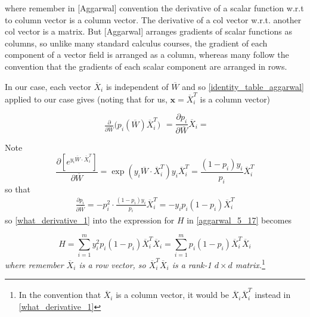 \documentclass[12pt,a4paper]{article}
\begin{document}
where remember in [Aggarwal] convention the derivative of a scalar function w.r.t to column vector is a column vector. The derivative of a col vector w.r.t. another col vector is a matrix. But [Aggarwal] arranges gradients of scalar functions as columns, so unlike many standard calculus courses, the gradient of each component of a vector field is arranged as a column, whereas many follow the convention that the gradients of each scalar component are arranged in rows. 

In our case, each vector $\overline{X}_i$ is independent of $\overline{W}$ and so \eqref{identity_table_aggarwal} applied to our case gives (noting that for us, $\mathbf{x}=\overline{X}_i^T $ is a column vector)

\begin{equation}\label{what_derivative_1}
\begin{aligned}
\frac{\partial }{\partial \overline{W}}\big(p_i(\overline{W}) \overline{X}_i^T \big)
\end{aligned}=\frac{\partial p_i}{\partial \overline{W}}\overline{X}_i=
\end{equation}

Note 
\begin{equation}
\frac{\partial [e^{y_i\overline{W}\cdot \overline{X}_i^T} ]}{\partial \overline{W}}= \exp\left({y_i\overline{W}\cdot \overline{X}_i^T}\right) y_i\overline{X}_i^T =\frac{(1-p_i)y_i}{p_i} \overline{X}_i^T
\end{equation}
so that
\begin{align}\label{partial_p_i}
\frac{\partial p_i}{\partial \overline{W}}=-p_i^2\cdot\frac{(1-p_i)y_i}{p_i} \overline{X}_i^T
= -y_i p_i(1-p_i)\overline{X}_i^T
\end{align}
so \eqref{what_derivative_1} into the expression for $H$ in \eqref{aggarwal_5_17} becomes 

\begin{equation}\label{what_derivative_1}
H=  \sum_{i=1}^m y_i^2  p_i(1-p_i)\overline{X}_i^T  \overline{X}_i
=\sum_{i=1}^m    p_i(1-p_i)\overline{X}_i^T  \overline{X}_i
\end{equation}
\textit{where remember $\overline{X}_i$ is a row vector, so $\overline{X}_i^T  \overline{X}_i$ is a rank-1 $d\times d$ matrix.}\footnote{In the convention that $\overline{X}_i$ is a column vector, it would be $ \overline{X}_i  \overline{X}_i^T$ instead in \eqref{what_derivative_1}}
\end{document}
